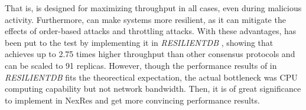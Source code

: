 \par That is, \RCC{} is designed for maximizing throughput in all cases, even during malicious activity. 
Furthermore, \RCC{} can make systems more resilient, as it can mitigate the effects of order-based attacks 
and throttling attacks.
With these advantages, \RCC{} has been put to the test by implementing it in \textit{RESILIENTDB} \cite{gupta2020resilientdb, rahnama2020scalable}, 
showing that \RCC{} achieves up to 2.75 times higher throughput than other consensus protocols and 
can be scaled to 91 replicas. However, though the performance results of \RCC{} in \textit{RESILIENTDB} fits 
the theorectical expectation, the actual bottleneck was CPU computing capability but not network bandwidth. Then, 
it is of great significance to implement \RCC{} in NexRes and get more convincing performance results.